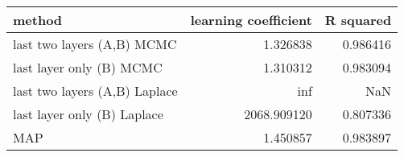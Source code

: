 \begin{tabular}{lrr}
\toprule
                        method &  learning coefficient &  R squared \\
\midrule
    last two layers (A,B) MCMC &              1.326838 &   0.986416 \\
      last layer only (B) MCMC &              1.310312 &   0.983094 \\
 last two layers (A,B) Laplace &                   inf &        NaN \\
   last layer only (B) Laplace &           2068.909120 &   0.807336 \\
                           MAP &              1.450857 &   0.983897 \\
\bottomrule
\end{tabular}
